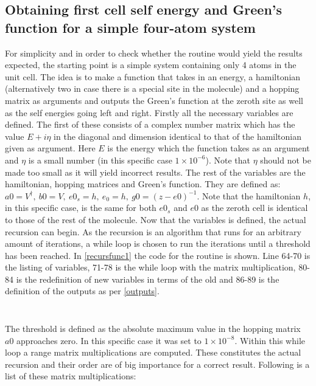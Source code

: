 \subsection{Obtaining first cell self energy and Green's function for a simple four-atom system}\label{recursionroutinesec}
For simplicity and in order to check whether the routine would yield the results expected, the starting point is a simple system containing only 4 atoms in the unit cell. The idea is to make a function that takes in an energy, a hamiltonian (alternatively two in case there is a special site in the molecule) and a hopping matrix as arguments and outputs the Green's function at the zeroth site as well as the self energies going left and right. Firstly all the necessary variables are defined. The first of these consists of a complex number matrix which has the value \(E + i\eta\) in the diagonal and dimension identical to that of the hamiltonian given as argument. Here \(E\) is the energy which the function takes as an argument and \(\eta\) is a small number (in this specific case \(1\times10^{-6}\)). Note that \(\eta\) should not be made too small as it will yield incorrect results. The rest of the variables are the hamiltonian, hopping matrices and Green's function. They are defined as: \(a0 = V^{\dagger}, \ b0 = V, \ e0_{s} = h, \ e_{0} = h, \ g0 = (z-e0)^{-1}\). Note that the hamiltonian \(h\), in this specific case, is the same for both \(e0_{s}\) and \(e0\) as the zeroth cell is identical to those of the rest of the molecule. Now that the variables is defined, the actual recursion can begin. As the recursion is an algorithm that runs for an arbitrary amount of iterations, a while loop is chosen to run the iterations until a threshold has been reached. In \cref{recursfunc1} the code for the routine is shown. Line 64-70 is the listing of variables, 71-78 is the while loop with the matrix multiplication, 80-84 is the redefinition of new variables in terms of the old and 86-89 is the definition of the outputs as per \cref{outputs}.\\
\noindent
\begin{listing}
    \begin{minipage}[b]{.40\textwidth}
        \inputminted[bgcolor=Black, breaklines, breakanywhere, linenos=true, python3=true, firstline=64, lastline=79]{python}{Listings/Functions.py}
    \end{minipage}
\end{listing}
\begin{listing}
    \begin{minipage}[b]{.40\textwidth}
        \inputminted[bgcolor=Black, breaklines, breakanywhere, linenos=true, python3=true, firstline=80, lastline=91]{python}{Listings/Functions.py}
    \end{minipage}
\end{listing}The threshold is defined as the absolute maximum value in the hopping matrix \(a0\) approaches zero. In this specific case it was set to \(1\times10^{-8} \). Within this while loop a range matrix multiplications are computed. These constitutes the actual recursion and their order are of big importance for a correct result. Following is a list of these matrix multiplications: 
